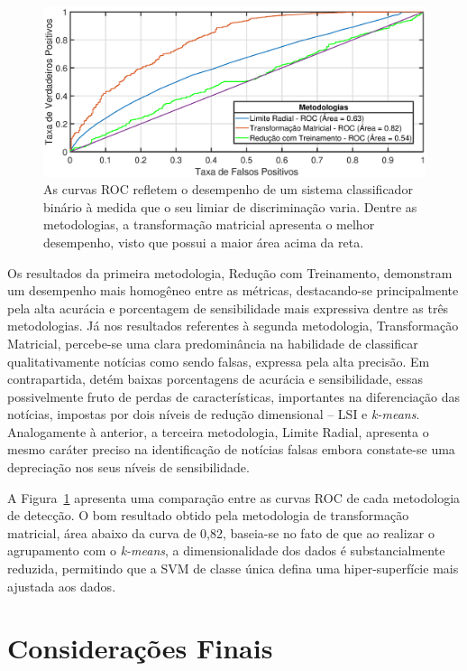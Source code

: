 \documentclass{SBCbookchapter}
\begin{document}
\begin{figure}[b!]
	\centering
		\includegraphics[width=.9\textwidth]{rocs.eps}
		\caption{As curvas ROC refletem o desempenho de um sistema classificador binário à medida que o seu limiar de discriminação varia. Dentre as metodologias, a transformação matricial apresenta o melhor desempenho, visto que possui a maior área acima da reta.}
		\label{fig:rocs}
\end{figure}

Os resultados da primeira metodologia, Redução com Treinamento, demonstram um desempenho mais homogêneo entre as métricas, destacando-se principalmente pela alta acurácia e porcentagem de sensibilidade mais expressiva dentre as três metodologias. Já nos resultados referentes à segunda metodologia, Transformação Matricial, percebe-se uma clara predominância na habilidade de classificar qualitativamente notícias como sendo falsas, expressa pela alta precisão. Em contrapartida, detém baixas porcentagens de acurácia e sensibilidade, essas possivelmente fruto de perdas de características, importantes na diferenciação das notícias, impostas por dois níveis de redução dimensional -- LSI e \textit{k-means}. Analogamente à anterior, a terceira metodologia, Limite Radial, apresenta o mesmo caráter preciso na identificação de notícias falsas embora constate-se uma depreciação nos seus níveis de sensibilidade.


A Figura~\ref{fig:rocs} apresenta uma comparação entre as curvas ROC de cada metodologia de detecção. O bom resultado obtido pela metodologia de transformação matricial, área abaixo da curva de 0,82, baseia-se no fato de que ao realizar o agrupamento com o \textit{k-means}, a dimensionalidade dos dados é substancialmente reduzida, permitindo que a SVM de classe única defina uma hiper-superfície mais ajustada aos dados.

\section{Considerações Finais}
\label{sec:conclusao}
\end{document}
